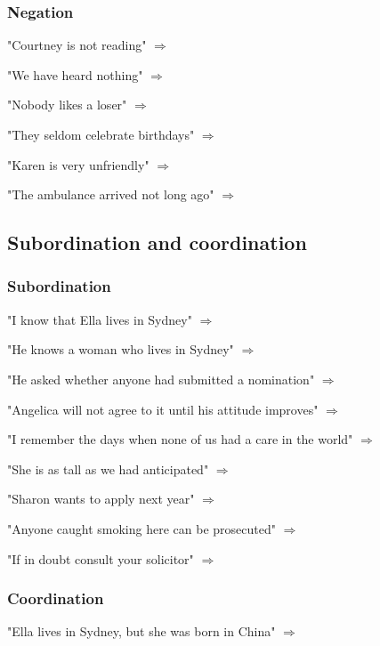 \subsubsection{Negation}

"Courtney is not reading" $\Longrightarrow$ \formula{}

"We have heard nothing" $\Longrightarrow$ \formula{}

"Nobody likes a loser" $\Longrightarrow$ \formula{}

"They seldom celebrate birthdays" $\Longrightarrow$ \formula{}

"Karen is very unfriendly" $\Longrightarrow$ \formula{}

"The ambulance arrived not long ago" $\Longrightarrow$ \formula{}

\subsection{Subordination and coordination}

\subsubsection{Subordination}

"I know that Ella lives in Sydney" $\Longrightarrow$ \formula{}

"He knows a woman who lives in Sydney" $\Longrightarrow$ \formula{}

"He asked whether anyone had submitted a nomination" $\Longrightarrow$ \formula{}

"Angelica will not agree to it until his attitude improves" $\Longrightarrow$ \formula{}

"I remember the days when none of us had a care in the world" $\Longrightarrow$ \formula{}

"She is as tall as we had anticipated" $\Longrightarrow$ \formula{}

"Sharon wants to apply next year" $\Longrightarrow$ \formula{}

"Anyone caught smoking here can be prosecuted" $\Longrightarrow$ \formula{}

"If in doubt consult your solicitor" $\Longrightarrow$ \formula{}

\subsubsection{Coordination}

"Ella lives in Sydney, but she was born in China" $\Longrightarrow$ \formula{}

